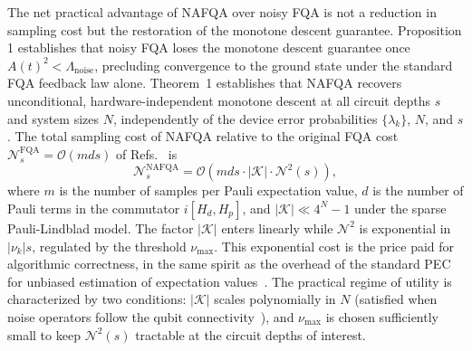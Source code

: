 \documentclass[10pt, superscriptaddress,aps,pra,twocolumn,showpacs,nofootinbib, longbibliography, notitlepage,floatfix]{revtex4-2}
\begin{document}
The net practical advantage of NAFQA over noisy FQA is not a reduction in sampling cost but the restoration of the monotone descent guarantee. Proposition 1 establishes that noisy FQA loses the monotone descent guarantee once $A(t)^2 < \Lambda_\mathrm{noise}$, precluding convergence to the ground state under the standard FQA feedback law alone. Theorem~1 establishes that NAFQA recovers unconditional, hardware-independent monotone descent at all circuit depths $s$ and system sizes $N$, independently of the device error probabilities $\{\lambda_k\}$, $N$, and $s$. The total sampling cost of NAFQA relative to the original FQA cost $\mathcal{N}_s^{\text{FQA}} = \mathcal{O}(mds)$ of Refs.~\cite{SarovarPRL2022, Magann_PRA_2022} is
\begin{equation}
    \mathcal{N}_s^{\text{NAFQA}} = \mathcal{O}\!\left(
    mds \cdot |\mathcal{K}| \cdot \mathcal{N}^2(s)
    \right),
    \label{eq:nafqa_cost}
\end{equation}
where $m$ is the number of samples per Pauli expectation value, $d$ is the number of Pauli terms in the commutator $i[H_d, H_p]$, and $|\mathcal{K}| \ll 4^N - 1$ under the sparse Pauli-Lindblad model. The factor $|\mathcal{K}|$ enters linearly while $\mathcal{N}^2$ is exponential in $|\nu_k|s$, regulated by the threshold $\nu_{\max}$. This exponential cost is the price paid for algorithmic correctness, in the same spirit as the overhead of the standard PEC for unbiased estimation of expectation values~\cite{vandenBerg2023_natphys}. The practical regime of utility is characterized by two conditions: $|\mathcal{K}|$ scales polynomially in $N$ (satisfied when noise operators follow the qubit connectivity~\cite{vandenBerg2023_natphys}), and $\nu_\mathrm{max}$ is chosen sufficiently small to keep $\mathcal{N}^2(s)$ tractable at the circuit depths of interest.
\end{document}
